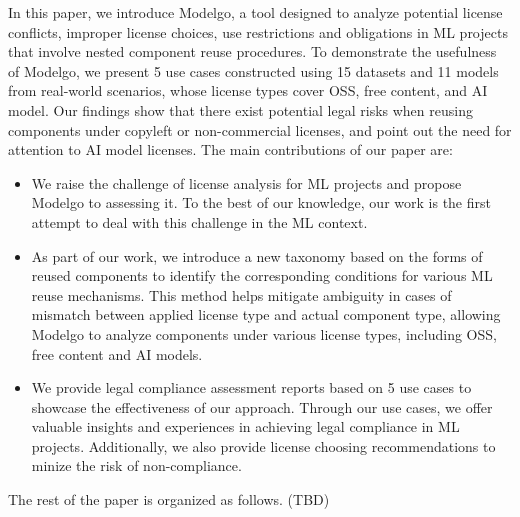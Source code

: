 In this paper, we introduce Modelgo, a tool designed to analyze potential license conflicts, improper license choices, use restrictions and obligations in ML projects that involve nested component reuse procedures.
To demonstrate the usefulness of Modelgo, we present 5 use cases constructed using 15 datasets and 11 models from real-world scenarios, whose license types cover OSS, free content, and AI model.
Our findings show that there exist potential legal risks when reusing  components under copyleft or non-commercial licenses, and point out the need for attention to AI model licenses.
The main contributions of our paper are:
\begin{itemize}
    \item We raise the challenge of license analysis for ML projects and propose Modelgo to assessing it. To the best of our knowledge, our work is the first attempt to deal with this challenge in the ML context.
    \item As part of our work, we introduce a new taxonomy based on the forms of reused components to identify the corresponding conditions for various ML reuse mechanisms. This method helps mitigate ambiguity in cases of mismatch between applied license type and actual component type, allowing Modelgo to analyze components under various license types, including OSS, free content and AI models.
    \item  We provide legal compliance assessment reports based on 5 use cases to showcase the effectiveness of our approach. 
    Through our use cases, we offer valuable insights and experiences in achieving legal compliance in ML projects. 
    Additionally, we also provide license choosing recommendations to minize the risk of non-compliance.
\end{itemize}

The rest of the paper is organized as follows. (TBD)



